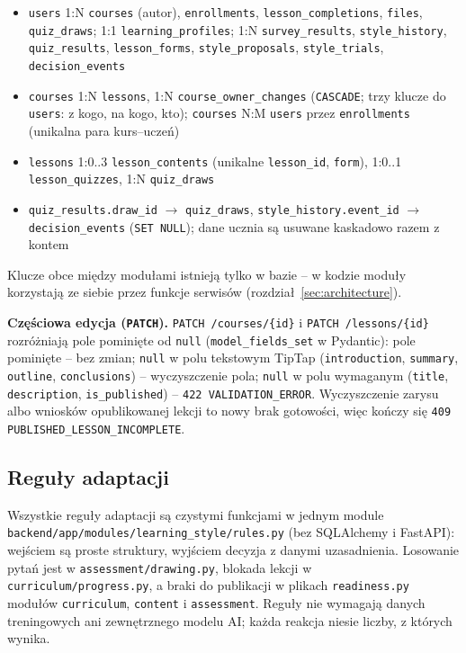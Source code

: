 \begin{itemize}[leftmargin=*]
    \item \texttt{users} 1:N \texttt{courses} (autor), \texttt{enrollments}, \texttt{lesson\_completions}, \texttt{files}, \texttt{quiz\_draws}; 1:1 \texttt{learning\_profiles}; 1:N \texttt{survey\_results}, \texttt{style\_history}, \texttt{quiz\_results}, \texttt{lesson\_forms}, \texttt{style\_proposals}, \texttt{style\_trials}, \texttt{decision\_events}
    \item \texttt{courses} 1:N \texttt{lessons}, 1:N \texttt{course\_owner\_changes} (\texttt{CASCADE}; trzy klucze do \texttt{users}: z kogo, na kogo, kto); \texttt{courses} N:M \texttt{users} przez \texttt{enrollments} (unikalna para kurs--uczeń)
    \item \texttt{lessons} 1:0..3 \texttt{lesson\_contents} (unikalne \texttt{lesson\_id}, \texttt{form}), 1:0..1 \texttt{lesson\_quizzes}, 1:N \texttt{quiz\_draws}
    \item \texttt{quiz\_results.draw\_id} $\to$ \texttt{quiz\_draws}, \texttt{style\_history.event\_id} $\to$ \texttt{decision\_events} (\texttt{SET NULL}); dane ucznia są usuwane kaskadowo razem z kontem
\end{itemize}

Klucze obce między modułami istnieją tylko w bazie -- w kodzie moduły korzystają ze siebie przez funkcje serwisów (rozdział~\ref{sec:architecture}).

\textbf{Częściowa edycja (\texttt{PATCH}).} \texttt{PATCH /courses/\{id\}} i \texttt{PATCH /lessons/\{id\}} rozróżniają pole pominięte od \texttt{null} (\texttt{model\_fields\_set} w Pydantic): pole pominięte -- bez zmian; \texttt{null} w polu tekstowym TipTap (\texttt{introduction}, \texttt{summary}, \texttt{outline}, \texttt{conclusions}) -- wyczyszczenie pola; \texttt{null} w polu wymaganym (\texttt{title}, \texttt{description}, \texttt{is\_published}) -- \texttt{422 VALIDATION\_ERROR}. Wyczyszczenie zarysu albo wniosków opublikowanej lekcji to nowy brak gotowości, więc kończy się \texttt{409 PUBLISHED\_LESSON\_INCOMPLETE}.

\subsection{Reguły adaptacji}
\label{sec:rules}

Wszystkie reguły adaptacji są czystymi funkcjami w jednym module \nolinkurl{backend/app/modules/learning_style/rules.py} (bez SQLAlchemy i FastAPI): wejściem są proste struktury, wyjściem decyzja z danymi uzasadnienia. Losowanie pytań jest w \nolinkurl{assessment/drawing.py}, blokada lekcji w \nolinkurl{curriculum/progress.py}, a braki do publikacji w plikach \texttt{readiness.py} modułów \texttt{curriculum}, \texttt{content} i \texttt{assessment}. Reguły nie wymagają danych treningowych ani zewnętrznego modelu AI; każda reakcja niesie liczby, z których wynika.

